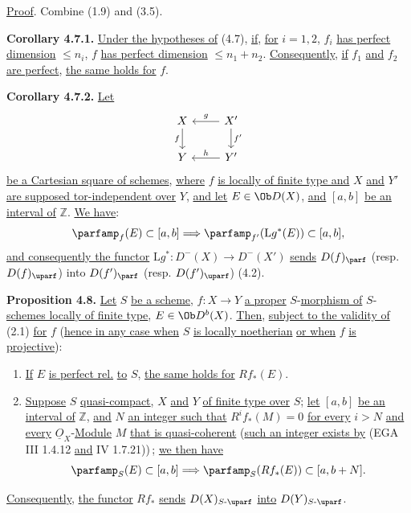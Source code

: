\uline{Proof}. Combine (1.9) and (3.5).

\textbf{Corollary 4.7.1.} \uline{Under the hypotheses of} (4.7), \uline{if}, \uline{for} \(i=1,2\), \(f_i\) \uline{has perfect dimension} \(\leq n_i\), \(f\) \uline{has perfect dimension} \(\leq n_1+n_2\). \uline{Consequently}, \uline{if} \(f_1\) \uline{and} \(f_2\) \uline{are perfect}, \uline{the same holds for} \(f\).

\textbf{Corollary 4.7.2.} \uline{Let}
\[
\begin{tikzcd}
X \arrow[d,"f"'] & X' \arrow[l,"g"'] \arrow[d,"f'"]\\
Y & Y' \arrow[l,"h"']
\end{tikzcd}
\]
\uline{be a Cartesian square of schemes}, \uline{where} \(f\) \uline{is locally of finite type and} \(X\) \uline{and} \(Y'\) \uline{are supposed tor-independent over} \(Y\), \uline{and let} \(E\in\Ob D(X)\), \uline{and} \([a,b]\) \uline{be an interval of} \(\mathbb Z\). \uline{We have}:
\[
 \parfamp_f(E)\subset[a,b]\Longrightarrow\parfamp_{f'}(\mathrm Lg^*(E))\subset[a,b],
\]
\uline{and consequently the functor} \(\mathrm Lg^*:D^-(X)\to D^-(X')\) \uline{sends} \(D(f)_{\parf}\) (resp. \(D(f)_{\uparf}\)) into \(D(f')_{\parf}\) (resp. \(D(f')_{\uparf}\)) (4.2).

\textbf{Proposition 4.8.} \uline{Let} \(S\) \uline{be a scheme}, \(f:X\to Y\) \uline{a proper} \(S\)-\uline{morphism of} \(S\)-\uline{schemes locally of finite type}, \(E\in\Ob D^b(X)\). \uline{Then}, \uline{subject to the validity of} (2.1) \uline{for} \(f\) (\uline{hence in any case when} \(S\) \uline{is locally noetherian} \uline{or when} \(f\) \uline{is projective}):
\begin{enumerate}[label=\alph*)]
\item \uline{If} \(E\) \uline{is perfect rel.} \uline{to} \(S\), \uline{the same holds for} \(Rf_*(E)\).
\item \uline{Suppose} \(S\) \uline{quasi-compact}, \(X\) \uline{and} \(Y\) \uline{of finite type over} \(S\); \uline{let} \([a,b]\) \uline{be an interval of} \(\mathbb Z\), \uline{and} \(N\) \uline{an integer such that} \(R^if_*(M)=0\) \uline{for every} \(i>N\) \uline{and}
%
\uline{every} \(\underline{O}_X\)-\uline{Module} \(M\) \uline{that is quasi-coherent} (\uline{such an integer exists by} (EGA III 1.4.12 \uline{and} IV 1.7.21))\,; \uline{we then have}
\[
 \parfamp_S(E)\subset[a,b]\Longrightarrow\parfamp_S(Rf_*(E))\subset[a,b+N].
\]
\end{enumerate}
\uline{Consequently}, \uline{the functor} \(Rf_*\) \uline{sends} \(D(X)_{S\text{-}\uparf}\) \uline{into} \(D(Y)_{S\text{-}\uparf}\).

